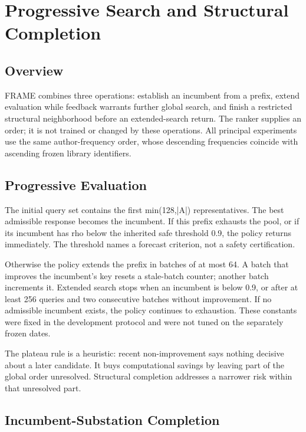\section{Progressive Search and Structural Completion}

\subsection{Overview}

FRAME combines three operations: establish an incumbent from a prefix, extend evaluation while feedback warrants further global search, and finish a restricted structural neighborhood before an extended-search return. The ranker supplies an order; it is not trained or changed by these operations. All principal experiments use the same author-frequency order, whose descending frequencies coincide with ascending frozen library identifiers.


\subsection{Progressive Evaluation}

The initial query set contains the first min(128,|A|) representatives. The best admissible response becomes the incumbent. If this prefix exhausts the pool, or if its incumbent has rho below the inherited safe threshold 0.9, the policy returns immediately. The threshold names a forecast criterion, not a safety certification.


Otherwise the policy extends the prefix in batches of at most 64. A batch that improves the incumbent's key resets a stale-batch counter; another batch increments it. Extended search stops when an incumbent is below 0.9, or after at least 256 queries and two consecutive batches without improvement. If no admissible incumbent exists, the policy continues to exhaustion. These constants were fixed in the development protocol and were not tuned on the separately frozen dates.


The plateau rule is a heuristic: recent non-improvement says nothing decisive about a later candidate. It buys computational savings by leaving part of the global order unresolved. Structural completion addresses a narrower risk within that unresolved part.


\subsection{Incumbent-Substation Completion}

